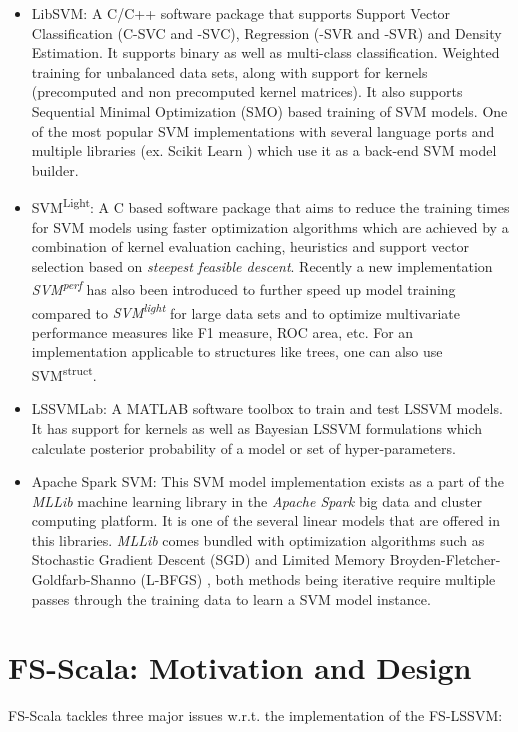 \begin{itemize}
\item LibSVM: A C/C++ software package that supports Support Vector Classification (C-SVC and \textnu-SVC),  Regression (\textepsilon-SVR and \textnu-SVR) and Density Estimation. It supports binary as well as multi-class classification. Weighted training for unbalanced data sets, along with support for kernels (precomputed and non precomputed kernel matrices). It also supports Sequential Minimal Optimization (SMO) based training of SVM models. One of the most popular SVM implementations with several language ports and multiple libraries (ex. Scikit Learn \cite{scikit-learn}) which use it as a back-end SVM model builder. 

\item SVM\textsuperscript{Light}: A C based software package that aims to reduce the training times for SVM models using faster optimization algorithms which are achieved by a combination of kernel evaluation caching, heuristics and support vector selection based on \textit{steepest feasible descent}. Recently a new implementation \textit{SVM\textsuperscript{perf}} has also been introduced to further speed up model training compared to \textit{SVM\textsuperscript{light}} for large data sets and to optimize multivariate performance measures like F1 measure, ROC area, etc. For an implementation applicable to structures like trees, one can also use SVM\textsuperscript{struct}. 


\item LSSVMLab: A MATLAB software toolbox to train and test LSSVM models. It has support for kernels as well as Bayesian LSSVM formulations which calculate posterior probability of a model or set of hyper-parameters.

\item Apache Spark SVM: This SVM model implementation exists as a part of the \textit{MLLib} machine learning library in the \textit{Apache Spark} big data and cluster computing platform. It is one of the several linear models that are offered in this libraries. \textit{MLLib} comes bundled with optimization algorithms such as Stochastic Gradient Descent (SGD) \cite{Bottou:2010}  and Limited Memory Broyden-Fletcher-Goldfarb-Shanno (L-BFGS) \cite{Andrew:2007, BFGS}, both methods being iterative require multiple passes through the training data to learn a SVM model instance.

\end{itemize}

\section{FS-Scala: Motivation and Design}
FS-Scala tackles three major issues w.r.t. the implementation of the FS-LSSVM:

